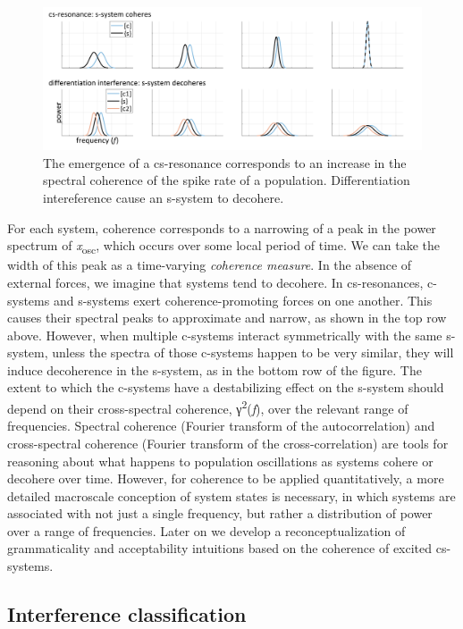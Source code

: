   
\begin{figure}
\includegraphics[width=\textwidth]{figures/Tilsen-img93.png}
\caption{The emergence of a cs-resonance corresponds to an increase in the spectral coherence of the spike rate of a population. Differentiation intereference cause an s-system to decohere.}
\label{fig:4:43}
\end{figure}
 

  For each system, coherence corresponds to a narrowing of a peak in the power spectrum of \textit{x}\textsubscript{osc}, which occurs over some local period of time. We can take the width of this peak as a time-varying \textit{coherence measure}. In the absence of external forces, we imagine that systems tend to decohere. In cs-resonances, c-systems and s-systems exert coherence-promoting forces on one another. This causes their spectral peaks to approximate and narrow, as shown in the top row above. However, when multiple c-systems interact symmetrically with the same s-system, unless the spectra of those c-systems happen to be very similar, they will induce decoherence in the s-system, as in the bottom row of the figure. The extent to which the c-systems have a destabilizing effect on the s-system should depend on their cross-spectral coherence, γ\textsuperscript{2}(\textit{f}), over the relevant range of frequencies. Spectral coherence (Fourier transform of the autocorrelation) and cross-spectral coherence (Fourier transform of the cross-correlation) are tools for reasoning about what happens to population oscillations as systems cohere or decohere over time. However, for coherence to be applied quantitatively, a more detailed macroscale conception of system states is necessary, in which systems are associated with not just a single frequency, but rather a distribution of power over a range of frequencies. Later on we develop a reconceptualization of grammaticality and acceptability intuitions based on the coherence of excited cs-systems.

\subsection{Interference classification}

